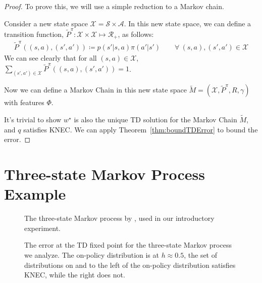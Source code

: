 \begin{proof}

  To prove this, we will use a simple reduction to a Markov chain.

  Consider a new state space $\mathcal{X} = \mathcal{S} \times \mathcal{A}$.
  In this new state space, we can define a transition function, $\tilde{P}^\pi : \mathcal{X} \times \mathcal{X} \mapsto \mathcal{R}_+$, as follows:
  \begin{align*}
    \tilde{P}^\pi((s, a), (s', a')) \coloneqq p(s'|s, a) \pi(a'|s') \quad \quad \forall \ (s, a), (s', a') \in \mathcal{X}
  \end{align*}
  We can see clearly that for all $(s, a) \in \mathcal{X}$, $\sum_{(s', a') \in \mathcal{X}} \tilde{P}^\pi((s, a), (s', a')) = 1$.

  Now we can define a Markov Chain in this new state space $\tilde{M} = (\mathcal{X}, \tilde{P}^\pi, R, \gamma)$ with features $\Phi$.

  It's trivial to show $w^\star$ is also the unique TD solution for the Markov Chain $\tilde{M}$,
  and $q$ satisfies KNEC. We can apply Theorem~\ref{thm:boundTDError} to bound the error.

\end{proof}


\section{Three-state Markov Process Example}
\label{app:threestate}


\begin{figure}[t]
  \centering
  
  \caption{The three-state Markov process by \citet{manek2022pitfalls}, used in our introductory experiment. }
  \label{fig:threestatemdp}
\end{figure}

\begin{figure}[t]
  \centering
  
  \caption{The error at the TD fixed point for the three-state Markov process we analyze. The on-policy distribution is at $h\approx0.5$, the set of distributions on and to the left of the on-policy distribution satisfies KNEC, while the right does not. }
  \label{fig:threestatefixedpoint}
\end{figure}


